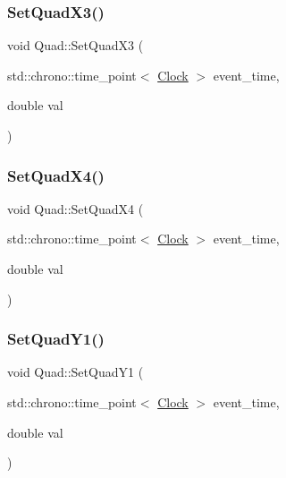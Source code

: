 \mbox{\label{classQuad_a0cbdd18a95fe7240b09c40fcee29f5df}} 
\subsubsection{\texorpdfstring{Set\+Quad\+X3()}{SetQuadX3()}}
{\footnotesize\ttfamily void Quad\+::\+Set\+Quad\+X3 (\begin{DoxyParamCaption}\item[{std\+::chrono\+::time\+\_\+point$<$ \mbox{\hyperlink{universe_8h_a0ef8d951d1ca5ab3cfaf7ab4c7a6fd80}{Clock}} $>$}]{event\+\_\+time,  }\item[{double}]{val }\end{DoxyParamCaption})\hspace{0.3cm}{\ttfamily [inline]}}

\mbox{\label{classQuad_ac49d711fa31a12ba24ad65c959c74e05}} 
\subsubsection{\texorpdfstring{Set\+Quad\+X4()}{SetQuadX4()}}
{\footnotesize\ttfamily void Quad\+::\+Set\+Quad\+X4 (\begin{DoxyParamCaption}\item[{std\+::chrono\+::time\+\_\+point$<$ \mbox{\hyperlink{universe_8h_a0ef8d951d1ca5ab3cfaf7ab4c7a6fd80}{Clock}} $>$}]{event\+\_\+time,  }\item[{double}]{val }\end{DoxyParamCaption})\hspace{0.3cm}{\ttfamily [inline]}}

\mbox{\label{classQuad_a3f0f9162be2b1ec2e2597a163586fb01}} 
\subsubsection{\texorpdfstring{Set\+Quad\+Y1()}{SetQuadY1()}}
{\footnotesize\ttfamily void Quad\+::\+Set\+Quad\+Y1 (\begin{DoxyParamCaption}\item[{std\+::chrono\+::time\+\_\+point$<$ \mbox{\hyperlink{universe_8h_a0ef8d951d1ca5ab3cfaf7ab4c7a6fd80}{Clock}} $>$}]{event\+\_\+time,  }\item[{double}]{val }\end{DoxyParamCaption})\hspace{0.3cm}{\ttfamily [inline]}}

